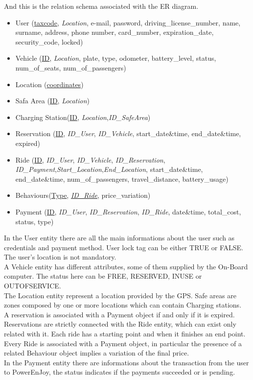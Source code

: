  And this is the relation schema associated with the ER diagram.
\begin{itemize} 
	\item{User (\underline{taxcode}, \textit{Location}, e-mail, password, driving\_license\_number, name, surname, address, phone number, card\_number, expiration\_date, security\_code, locked)}
	\item{Vehicle (\underline{ID}, \textit{Location}, plate, type, odometer, battery\_level, status, num\_of\_seats, num\_of\_passengers) }
	\item{Location (\underline{coordinates})}	
	\item{Safa Area (\underline{ID}, \textit{Location})} %
	\item{Charging Station(\underline{ID}, \textit{Location},\textit{ID\_SafeArea})}
	\item{Reservation (\underline{ID}, \textit{ID\_User}, \textit{ID\_Vehicle}, start\_date\&time, end\_date\&time, expired)}
	\item{Ride (\underline{ID}, \textit{ID\_User}, \textit{ID\_Vehicle}, \textit{ID\_Reservation}, \textit{ID\_Payment},\textit{Start\_Location},\textit{End\_Location}, start\_date\&time, end\_date\&time, num\_of\_passengers, travel\_distance, battery\_usage)}
	\item{Behaviours(\underline{Type}, \underline{\textit{ID\_Ride}}, price\_variation)}
	\item{Payment (\underline{ID}, \textit{ID\_User}, \textit{ID\_Reservation}, \textit{ID\_Ride}, date\&time, total\_cost, status, type)}
\end{itemize}
In the User entity there are all the main informations about the user such as credentials and payment method. User lock tag can be either TRUE or FALSE. The user's location is not mandatory.
\\A Vehicle entity has different attributes, some of them supplied by the On-Board computer. The status here can be FREE, RESERVED, INUSE or OUTOFSERVICE.
\\The Location entity represent a location provided by the GPS. Safe areas are zones composed by one or more locations which can contain Charging stations.
\\A reservation is associated with a Payment object if and only if it is expired. Reservations are strictly connected with the Ride entity, which can exist only related with it. Each ride has a starting point and when it finishes an end point. 
\\Every Ride is associated with a Payment object, in particular the presence of a related Behaviour object implies a variation of the final price. 
\\In the Payment entity there are informations about the transaction from the user to PowerEnJoy, the status indicates if the payments succeeded or is pending.
